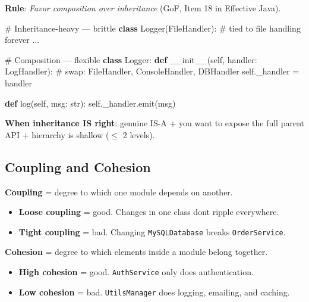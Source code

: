 \documentclass[11pt]{article}
\providecommand{\tightlist}{\setlength{\itemsep}{1pt}\setlength{\parskip}{0pt}}
\newenvironment{Shaded}{\begin{snugshade}}{\end{snugshade}}
\newcommand{\BuiltInTok}[1]{\textcolor[rgb]{0.50,0.55,0.55}{#1}}
\newcommand{\CommentTok}[1]{\textcolor[rgb]{0.48,0.49,0.49}{#1}}
\newcommand{\FunctionTok}[1]{\textcolor[rgb]{0.56,0.27,0.68}{#1}}
\newcommand{\KeywordTok}[1]{\textcolor[rgb]{0.81,0.81,0.76}{\textbf{#1}}}
\newcommand{\NormalTok}[1]{\textcolor[rgb]{0.81,0.81,0.76}{#1}}
\newcommand{\OperatorTok}[1]{\textcolor[rgb]{0.81,0.81,0.76}{#1}}
\newcommand{\VariableTok}[1]{\textcolor[rgb]{0.15,0.68,0.68}{#1}}
\begin{document}
\textbf{Rule}: \emph{Favor composition over inheritance} (GoF, Item 18 in Effective Java).


\begin{Shaded}
\begin{Highlighting}[]
\CommentTok{\# Inheritance{-}heavy — brittle}
\KeywordTok{class}\NormalTok{ Logger(FileHandler):          }\CommentTok{\# tied to file handling forever}
\NormalTok{    ...}

\CommentTok{\# Composition — flexible}
\KeywordTok{class}\NormalTok{ Logger:}
    \KeywordTok{def} \FunctionTok{\_\_init\_\_}\NormalTok{(}\VariableTok{self}\NormalTok{, handler: LogHandler):  }\CommentTok{\# swap: FileHandler, ConsoleHandler, DBHandler}
        \VariableTok{self}\NormalTok{.\_handler }\OperatorTok{=}\NormalTok{ handler}

    \KeywordTok{def}\NormalTok{ log(}\VariableTok{self}\NormalTok{, msg: }\BuiltInTok{str}\NormalTok{):}
        \VariableTok{self}\NormalTok{.\_handler.emit(msg)}
\end{Highlighting}
\end{Shaded}

\textbf{When inheritance IS right}: genuine IS-A + you want to expose the full parent API + hierarchy is shallow (\(\leq\) 2 levels).

\subsection{Coupling and Cohesion}\label{coupling-and-cohesion}

\textbf{Coupling} = degree to which one module depends on another.

\begin{itemize}
\tightlist
\item
  \textbf{Loose coupling} = good. Changes in one class don\textquotesingle t ripple everywhere.
\item
  \textbf{Tight coupling} = bad. Changing \texttt{MySQLDatabase} breaks \texttt{OrderService}.
\end{itemize}

\textbf{Cohesion} = degree to which elements inside a module belong together.

\begin{itemize}
\tightlist
\item
  \textbf{High cohesion} = good. \texttt{AuthService} only does authentication.
\item
  \textbf{Low cohesion} = bad. \texttt{UtilsManager} does logging, emailing, and caching.
\end{itemize}
\end{document}
